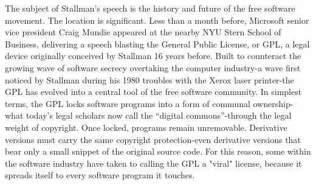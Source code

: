 \ifdefined\eng
The subject of Stallman's speech is the history and future of the free software movement. The location is significant. Less than a month before, Microsoft senior vice president Craig Mundie appeared at the nearby NYU Stern School of Business, delivering a speech blasting the General Public License, or GPL, a legal device originally conceived by Stallman 16 years before. Built to counteract the growing wave of software secrecy overtaking the computer industry-a wave first noticed by Stallman during his 1980 troubles with the Xerox laser printer-the GPL has evolved into a central tool of the free software community. In simplest terms, the GPL locks software programs into a form of communal ownership-what today's legal scholars now call the ``digital commons''-through the legal weight of copyright. Once locked, programs remain unremovable. Derivative versions must carry the same copyright protection-even derivative versions that bear only a small snippet of the original source code. For this reason, some within the software industry have taken to calling the GPL a "viral" license, because it spreads itself to every software program it touches.
\fi

